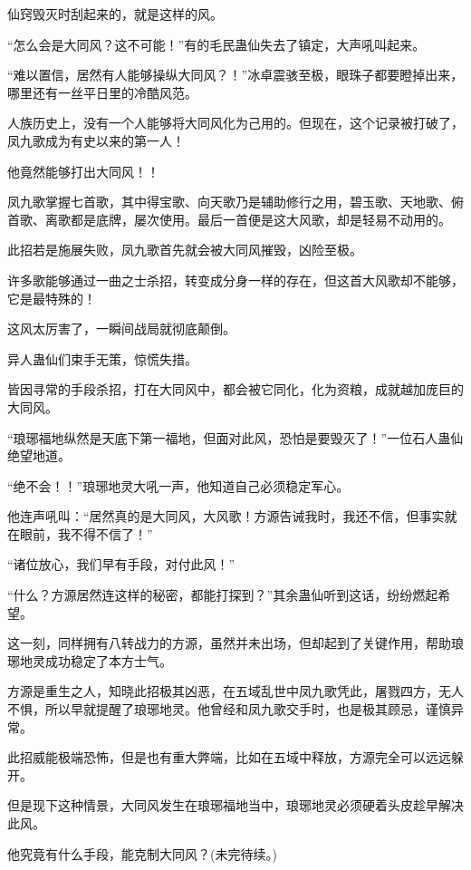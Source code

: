 \begin{this_body}
仙窍毁灭时刮起来的，就是这样的风。

“怎么会是大同风？这不可能！”有的毛民蛊仙失去了镇定，大声吼叫起来。

“难以置信，居然有人能够操纵大同风？！”冰卓震骇至极，眼珠子都要瞪掉出来，哪里还有一丝平日里的冷酷风范。

人族历史上，没有一个人能够将大同风化为己用的。但现在，这个记录被打破了，凤九歌成为有史以来的第一人！

他竟然能够打出大同风！！

凤九歌掌握七首歌，其中得宝歌、向天歌乃是辅助修行之用，碧玉歌、天地歌、俯首歌、离歌都是底牌，屡次使用。最后一首便是这大风歌，却是轻易不动用的。

此招若是施展失败，凤九歌首先就会被大同风摧毁，凶险至极。

许多歌能够通过一曲之士杀招，转变成分身一样的存在，但这首大风歌却不能够，它是最特殊的！

这风太厉害了，一瞬间战局就彻底颠倒。

异人蛊仙们束手无策，惊慌失措。

皆因寻常的手段杀招，打在大同风中，都会被它同化，化为资粮，成就越加庞巨的大同风。

“琅琊福地纵然是天底下第一福地，但面对此风，恐怕是要毁灭了！”一位石人蛊仙绝望地道。

“绝不会！！”琅琊地灵大吼一声，他知道自己必须稳定军心。

他连声吼叫：“居然真的是大同风，大风歌！方源告诫我时，我还不信，但事实就在眼前，我不得不信了！”

“诸位放心，我们早有手段，对付此风！”

“什么？方源居然连这样的秘密，都能打探到？”其余蛊仙听到这话，纷纷燃起希望。

这一刻，同样拥有八转战力的方源，虽然并未出场，但却起到了关键作用，帮助琅琊地灵成功稳定了本方士气。

方源是重生之人，知晓此招极其凶恶，在五域乱世中凤九歌凭此，屠戮四方，无人不惧，所以早就提醒了琅琊地灵。他曾经和凤九歌交手时，也是极其顾忌，谨慎异常。

此招威能极端恐怖，但是也有重大弊端，比如在五域中释放，方源完全可以远远躲开。

但是现下这种情景，大同风发生在琅琊福地当中，琅琊地灵必须硬着头皮趁早解决此风。

他究竟有什么手段，能克制大同风？(未完待续。)

\end{this_body}

